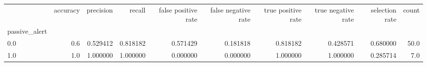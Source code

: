 \begin{tabular}{lrrrrrrrrr}
\toprule
{} &  accuracy &  precision &    recall &  false positive rate &  false negative rate &  true positive rate &  true negative rate &  selection rate &  count \\
passive\_alert &           &            &           &                      &                      &                     &                     &                 &        \\
\midrule
0.0           &       0.6 &   0.529412 &  0.818182 &             0.571429 &             0.181818 &            0.818182 &            0.428571 &        0.680000 &   50.0 \\
1.0           &       1.0 &   1.000000 &  1.000000 &             0.000000 &             0.000000 &            1.000000 &            1.000000 &        0.285714 &    7.0 \\
\bottomrule
\end{tabular}
